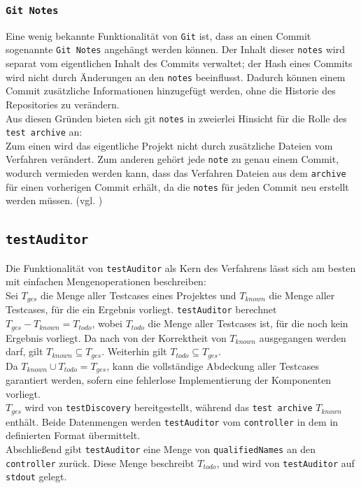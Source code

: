 \subsubsection{\texttt{Git Notes}}
Eine wenig bekannte Funktionalität von \texttt{Git} ist, dass an einen Commit sogenannte \texttt{Git Notes} angehängt werden können. Der Inhalt dieser \texttt{notes} wird separat vom eigentlichen Inhalt des Commits verwaltet; der Hash eines Commits wird nicht durch Änderungen an den \texttt{notes} beeinflusst. Dadurch können einem Commit zusätzliche Informationen hinzugefügt werden, ohne die Historie des Repositories zu verändern.\\
Aus diesen Gründen bieten sich git \texttt{notes} in zweierlei Hinsicht für die Rolle des \texttt{test archive} an:\\
Zum einen wird das eigentliche Projekt nicht durch zusätzliche Dateien vom Verfahren verändert. Zum anderen gehört jede \texttt{note} zu genau einem Commit, wodurch vermieden werden kann, dass das Verfahren Dateien aus dem \texttt{archive} für einen vorherigen Commit erhält, da die \texttt{notes} für jeden Commit neu erstellt werden müssen. (vgl. \cite{gitNotes})

\subsection{\texttt{testAuditor}}\label{Komponente_testAuditor}
Die Funktionalität von \texttt{testAuditor} als Kern des Verfahrens lässt sich am besten mit einfachen Mengenoperationen beschreiben:\\
Sei $T_{ges}$ die Menge aller Testcases eines Projektes und $T_{known}$ die Menge aller Testcases, für die ein Ergebnis vorliegt. \texttt{testAuditor} berechnet $T_{ges}-T_{known}=T_{todo}$, wobei $T_{todo}$ die Menge aller Testcases ist, für die noch kein Ergebnis vorliegt. Da nach  von der Korrektheit von $T_{known}$ ausgegangen werden darf, gilt $T_{known}\subseteq T_{ges}$. Weiterhin gilt $T_{todo}\subseteq T_{ges}$.\\
Da $T_{known}\cup T_{todo}=T_{ges}$, kann die vollständige Abdeckung aller Testcases garantiert werden, sofern eine fehlerlose Implementierung der Komponenten vorliegt.\\
$T_{ges}$ wird von \texttt{testDiscovery} bereitgestellt, während das \texttt{test archive} $T_{known}$ enthält. Beide Datenmengen werden \texttt{testAuditor} vom \texttt{controller} in dem in  definierten Format übermittelt.\\
Abschließend gibt \texttt{testAuditor} eine Menge von \texttt{qualifiedNames} an den \texttt{controller} zurück. Diese Menge beschreibt $T_{todo}$, und wird von \texttt{testAuditor} auf \texttt{stdout} gelegt. 

